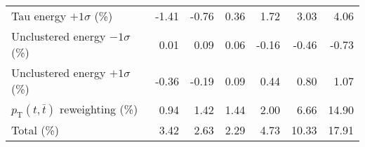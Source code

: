 \begin{table}[htbp]
{\begin{tabular}{lrrrrrr}
Tau energy $+1\sigma$ (\%) & -1.41 & -0.76 & 0.36 & 1.72 & 3.03 & 4.06 \\ 
Unclustered energy $-1\sigma$ (\%) & 0.01 & 0.09 & 0.06 & -0.16 & -0.46 & -0.73 \\ 
Unclustered energy $+1\sigma$ (\%) & -0.36 & -0.19 & 0.09 & 0.44 & 0.80 & 1.07 \\ 
$p_\mathrm{T}(t,\bar{t})$ reweighting (\%) & 0.94 & 1.42 & 1.44 & 2.00 & 6.66 & 14.90 \\ 
\hline 
Total (\%) & 3.42  & 2.63  & 2.29  & 4.73  & 10.33  & 17.91 \\ 
\hline 
\end{tabular}
}
\end{table}
